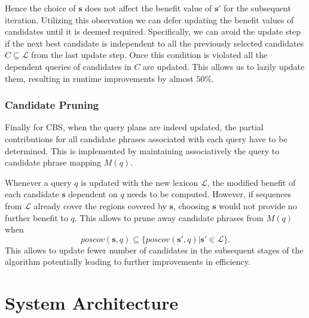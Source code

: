 Hence the choice of $\mathbf{s}$ does not affect the benefit value of $\mathbf{s}'$ for the subsequent iteration. Utilizing this observation we can defer updating the benefit values of candidates until it is deemed required. Specifically, we can avoid the update step if the next best candidate is independent to all the previously selected candidates $C \subseteq \mathcal{L}$ from the last update step. Once this condition is violated all the dependent queries of candidates in $C$ are updated. This allows us to lazily update them, resulting in runtime improvements by almost $50\%$. 



\subsubsection{Candidate Pruning}
Finally for CBS, when the query plans are indeed updated, the partial contributions for all candidate phrases associated with each query have to be determined. This is implemented by maintaining associatively the  query to candidate phrase mapping $M(q)$. 

Whenever a query $q$ is updated with the new lexicon $\mathcal{L}$, the modified benefit of each candidate $\mathbf{s}$ dependent on $q$ needs to be computed. However, if sequences from $\mathcal{L}$ already cover the regions covered by $\mathbf{s}$, choosing $\mathbf{s}$ would not provide no further benefit to $q$. This allows to prune away candidate phrases from $M(q)$ when $$poscov(\mathbf{s},q) \subseteq \{ poscov(\mathbf{s}', q) | \mathbf{s}' \in \mathcal{L}\}.$$ This allows to update fewer number of candidates in the subsequent stages of the algorithm potentially leading to further improvements in efficiency.

\section{System Architecture}
\label{sec:phrases:sysarch}

